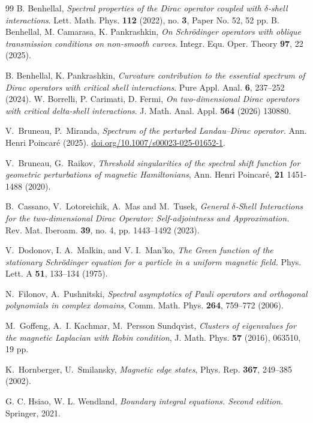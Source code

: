 \documentclass[11pt,a4paper,reqno,oneside]{amsproc}
\numberwithin{equation}{section}
\begin{document}
\begin{thebibliography}{99}
 B. Benhellal,  {\em Spectral properties of the Dirac operator coupled with  $\delta$-shell interactions}. Lett. Math. Phys. {\bf 112} (2022), no. {\bf 3}, Paper No. 52, 52 pp.
 B. Benhellal, M. Camarasa, K. Pankrashkin, {\em On Schr\"{o}dinger operators with oblique transmission conditions on non-smooth curves}. Integr. Equ. Oper. Theory {\bf 97},  22 (2025).

 B. Benhellal, K. Pankrashkin, {\em Curvature contribution to the essential spectrum of Dirac operators with critical shell interactions}. Pure Appl. Anal. {\bf 6}, 237--252 (2024).
 W. Borrelli, P. Carimati, D. Fermi, {\em  On two-dimensional Dirac operators with critical delta-shell interactions}. J. Math. Anal. Appl. {\bf 564} (2026) 130880.


 V.~Bruneau, P.~Miranda, \emph{Spectrum of the perturbed Landau--Dirac operator.} Ann. Henri Poincar\'e (2025). \url{doi.org/10.1007/s00023-025-01652-1}.

 V.~Bruneau,  G.~Raikov, \emph{Threshold singularities of the spectral shift function for geometric perturbations of magnetic Hamiltonians}, Ann. Henri Poincar\'e, {\bf 21} 1451- 1488 (2020).

   B.~Cassano, V.~Lotoreichik, A.~Mas and M.~Tusek, \emph{General $\delta$-Shell Interactions for the two-dimensional
Dirac Operator: Self-adjointness and Approximation.} Rev. Mat. Iberoam. {\bf 39}, no. 4, pp. 1443--1492 (2023).
     
        V.~Dodonov, I. A.~Malkin, and V. I.~Man'ko, \emph{The Green function of the stationary {S}chr\"odinger equation for a particle in a uniform magnetic field.} Phys. Lett. A {\bf 51}, 133--134 (1975).  
     
     
       N.~Filonov, A.~Pushnitski,
\emph{Spectral asymptotics of Pauli operators and orthogonal polynomials in complex domains},
Comm. Math. Phys. {\bf 264}, 759--772 (2006).


  M.~Goffeng,  A.~I. Kachmar,  M.~Persson Sundqvist, \emph{Clusters of eigenvalues for the magnetic Laplacian with Robin condition}, J. Math. Phys.
{\bf 57} (2016),  063510, 19 pp.


 K.~Hornberger, U.~Smilansky, {\em Magnetic edge states}, Phys. Rep. {\bf 367}, 249--385 (2002).


 G. C. Hsiao, W. L. Wendland, {\em Boundary integral equations. Second edition.}  Springer, 2021.


\end{thebibliography}
\end{document}
